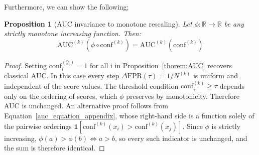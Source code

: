 \documentclass{article}
\theoremstyle{plain}
\newtheorem{theorem}{Proposition}
\theoremstyle{definition}
\theoremstyle{remark}
\begin{document}
Furthermore, we can show the following;

\begin{theorem}[AUC invariance to monotone rescaling]  \label{cor:auc_invariance}
Let $\phi : \mathbb{R} \to \mathbb{R}$ be any strictly monotone increasing function. Then:
\[
\text{AUC}^{(k)}\!\left(\phi \circ \text{conf}^{(k)}\right) = \text{AUC}^{(k)}\!\left(\text{conf}^{(k)}\right)
\]
\end{theorem}
\begin{proof}
Setting $\text{conf}_i^{(\hat{y}_i)} = 1$ for all i in Proposition~\ref{thorem:AUC} recovers classical AUC. In this case every step $\Delta\text{FPR}(\tau) = 1/N^{(k)}$ is uniform and independent of the score values. The threshold condition $\text{conf}_i^{(k)} \geq \tau$
depends only on the ordering of scores, which $\phi$ preserves by monotonicity. Therefore AUC is unchanged. An alternative proof follows from Equation~\ref{auc_equation_appendix}, whose right-hand side is a function solely of the pairwise orderings $\mathbf{1}[\text{conf}^{(k)}(x_i) > \text{conf}^{(k)}(x_j)]$. Since $\phi$ is strictly increasing, $\phi(a) > \phi(b) \iff a > b$, so every such indicator is unchanged, and the sum is therefore identical.
\end{proof}
\bigskip
\end{document}
